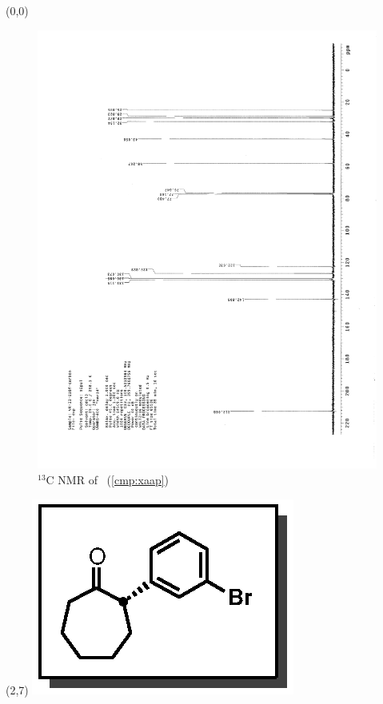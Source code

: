 \clearpage
\begin{textblock}{20}(0,0)
\begin{figure}[htb]
\caption{$^{13}$C NMR of  \CMPxaap\ (\ref{cmp:xaap})}
\includegraphics[scale=0.75, trim = 0mm 0mm 0mm 5mm,
clip]{chp_asymmetric/images/nmr/xaapC}
\vspace{-100pt}
\end{figure}
\end{textblock}
\begin{textblock}{1}(2,7)
\includegraphics[scale=0.8, angle=90]{chp_asymmetric/images/xaap}
\end{textblock}
\clearpage

